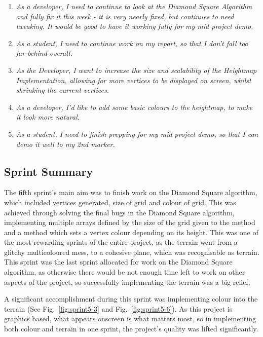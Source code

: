 \documentclass[a4paper,10pt]{report}
\begin{document}
\begin{enumerate}
    \item \textit{As a developer, I need to continue to look at the Diamond Square Algorithm and fully fix it this week - it is very nearly fixed, but continues to need tweaking. It would be good to have it working fully for my mid project demo. }
    \item \textit{As a student, I need to continue work on my report, so that I don't fall too far behind overall.}
    \item \textit{As the Developer, I want to increase the size and scalability of the Heightmap Implementation, allowing for more vertices to be displayed on screen, whilst shrinking the current vertices. }
    \item \textit{As a developer, I'd like to add some basic colours to the heightmap, to make it look more natural.}
    \item \textit{As a student, I need to finish prepping for my mid project demo, so that I can demo it well to my 2nd marker. }
    
\end{enumerate}
\subsection{Sprint Summary}

The fifth sprint's main aim was to finish work on the Diamond Square algorithm, which included vertices generated, size of grid and colour of grid. This was achieved through solving the final bugs in the Diamond Square algorithm, implementing multiple arrays defined by the size of the grid given to the method and a method which sets a vertex colour depending on its height. This was one of the most rewarding sprints of the entire project, as the terrain went from a glitchy multicoloured mess, to a cohesive plane, which was recognisable as terrain. This sprint was the last sprint allocated for work on the Diamond Square algorithm, as otherwise there would be not enough time left to work on other aspects of the project, so successfully implementing the terrain was a big relief. \medskip

A significant accomplishment during this sprint was implementing colour into the terrain (See Fig.~\ref{fig:sprint5-3} and Fig.~\ref{fig:sprint5-6}). As this project is graphics based, what appears onscreen is what matters most, so in implementing both colour and terrain in one sprint, the project's quality was lifted significantly.
\end{document}

